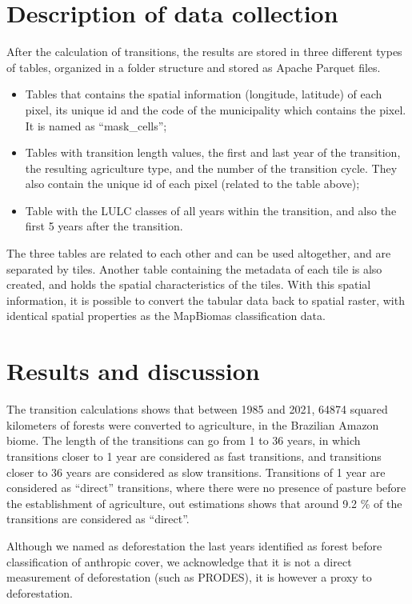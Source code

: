 \documentclass[essd, manuscript]{copernicus}
\begin{document}
\section{Description of data collection}

After the calculation of transitions, the results are stored in three different types of tables, organized in a folder structure and stored as Apache Parquet files.

\begin{itemize}
\item
  Tables that contains the spatial information (longitude, latitude) of each pixel, its unique id and the code of the municipality which contains the pixel.
  It is named as ``mask\_cells'';
\item
  Tables with transition length values, the first and last year of the transition, the resulting agriculture type, and the number of the transition cycle.
  They also contain the unique id of each pixel (related to the table above);
\item
  Table with the LULC classes of all years within the transition, and also the first 5 years after the transition.
\end{itemize}

The three tables are related to each other and can be used altogether, and are separated by tiles.
Another table containing the metadata of each tile is also created, and holds the spatial characteristics of the tiles.
With this spatial information, it is possible to convert the tabular data back to spatial raster, with identical spatial properties as the MapBiomas classification data.

\section{Results and discussion}

The transition calculations shows that between 1985 and 2021, 64874 squared kilometers of forests were converted to agriculture, in the Brazilian Amazon biome.
The length of the transitions can go from 1 to 36 years, in which transitions closer to 1 year are considered as fast transitions, and transitions closer to 36 years are considered as slow transitions.
Transitions of 1 year are considered as ``direct'' transitions, where there were no presence of pasture before the establishment of agriculture, out estimations shows that around 9.2 \% of the transitions are considered as ``direct''.

Although we named as deforestation the last years identified as forest before classification of anthropic cover, we acknowledge that it is not a direct measurement of deforestation (such as PRODES), it is however a proxy to deforestation.
\end{document}
